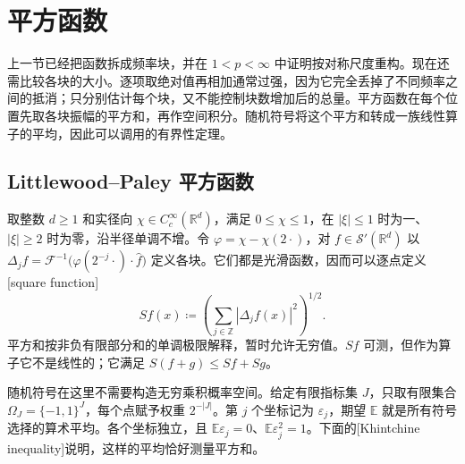 \section{平方函数}
\label{b2:sec:1904}

上一节已经把函数拆成频率块，并在 \(1<p<\infty\) 中证明按对称尺度重构。现在还需比较各块的大小。逐项取绝对值再相加通常过强，因为它完全丢掉了不同频率之间的抵消；只分别估计每个块，又不能控制块数增加后的总量。平方函数在每个位置先取各块振幅的平方和，再作空间积分。随机符号将这个平方和转成一族线性算子的平均，因此可以调用的有界性定理。

\subsection{Littlewood--Paley 平方函数}
\label{b2:subsec:190401}

取整数 \(d\geq1\) 和实径向 \(\chi\in C_c^\infty(\mathbb R^d)\)，满足 \(0\leq\chi\leq1\)，在 \(|\xi|\leq1\) 时为一、\(|\xi|\geq2\) 时为零，沿半径单调不增。令 \(\varphi=\chi-\chi(2\cdot)\)，对 \(f\in\mathcal S'(\mathbb R^d)\) 以
\(\Delta_jf=\mathcal F^{-1}\bigl(\varphi(2^{-j}\cdot)\cdot\widehat f\bigr)\)
定义各块。它们都是光滑函数，因而可以逐点定义[square function]
\[
 Sf(x)\coloneqq
 \left(\sum_{j\in\mathbb Z}|\Delta_jf(x)|^2\right)^{1/2}.
\]
平方和按非负有限部分和的单调极限解释，暂时允许无穷值。\(Sf\) 可测，但作为算子它不是线性的；它满足 \(S(f+g)\leq Sf+Sg\)。

\ProseParagraphBreak

随机符号在这里不需要构造无穷乘积概率空间。给定有限指标集 \(J\)，只取有限集合 \(\Omega_J=\{-1,1\}^J\)，每个点赋予权重 \(2^{-|J|}\)。第 \(j\) 个坐标记为 \(\varepsilon_j\)，期望 \(\mathbb E\) 就是所有符号选择的算术平均。各个坐标独立，且 \(\mathbb E\varepsilon_j=0\)、\(\mathbb E\varepsilon_j^2=1\)。下面的[Khintchine inequality]说明，这样的平均恰好测量平方和。

